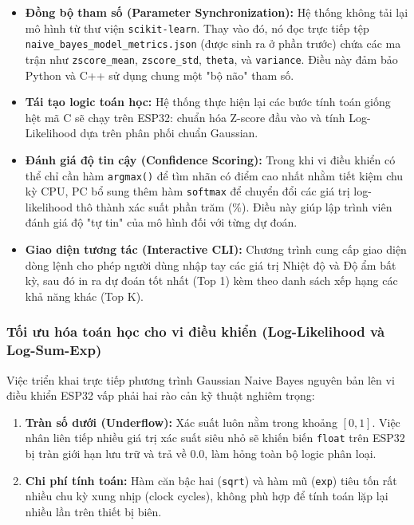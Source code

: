 \begin{itemize}
    \item \textbf{Đồng bộ tham số (Parameter Synchronization):} Hệ thống không tải lại mô hình từ thư viện \texttt{scikit-learn}. Thay vào đó, nó đọc trực tiếp tệp \texttt{naive\_bayes\_model\_metrics.json} (được sinh ra ở phần trước) chứa các ma trận như \texttt{zscore\_mean}, \texttt{zscore\_std}, \texttt{theta}, và \texttt{variance}. Điều này đảm bảo Python và C++ sử dụng chung một "bộ não" tham số.
    \item \textbf{Tái tạo logic toán học:} Hệ thống thực hiện lại các bước tính toán giống hệt mã C sẽ chạy trên ESP32: chuẩn hóa Z-score đầu vào và tính Log-Likelihood dựa trên phân phối chuẩn Gaussian.
    \item \textbf{Đánh giá độ tin cậy (Confidence Scoring):} Trong khi vi điều khiển có thể chỉ cần hàm \texttt{argmax()} để tìm nhãn có điểm cao nhất nhằm tiết kiệm chu kỳ CPU, PC bổ sung thêm hàm \texttt{softmax} để chuyển đổi các giá trị log-likelihood thô thành xác suất phần trăm (\%). Điều này giúp lập trình viên đánh giá độ "tự tin" của mô hình đối với từng dự đoán.
    \item \textbf{Giao diện tương tác (Interactive CLI):} Chương trình cung cấp giao diện dòng lệnh cho phép người dùng nhập tay các giá trị Nhiệt độ và Độ ẩm bất kỳ, sau đó in ra dự đoán tốt nhất (Top 1) kèm theo danh sách xếp hạng các khả năng khác (Top K).
\end{itemize}
\subsubsection{Tối ưu hóa toán học cho vi điều khiển (Log-Likelihood và Log-Sum-Exp)}

Việc triển khai trực tiếp phương trình Gaussian Naive Bayes nguyên bản lên vi điều khiển ESP32 vấp phải hai rào cản kỹ thuật nghiêm trọng:
\begin{enumerate}
    \item \textbf{Tràn số dưới (Underflow):} Xác suất luôn nằm trong khoảng $[0, 1]$. Việc nhân liên tiếp nhiều giá trị xác suất siêu nhỏ sẽ khiến biến \texttt{float} trên ESP32 bị tràn giới hạn lưu trữ và trả về $0.0$, làm hỏng toàn bộ logic phân loại.
    \item \textbf{Chi phí tính toán:} Hàm căn bậc hai (\texttt{sqrt}) và hàm mũ (\texttt{exp}) tiêu tốn rất nhiều chu kỳ xung nhịp (clock cycles), không phù hợp để tính toán lặp lại nhiều lần trên thiết bị biên.
\end{enumerate}


